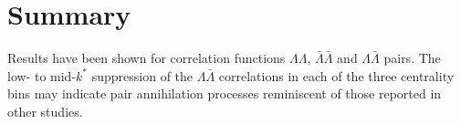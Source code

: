 \section{Summary}
Results have been shown for correlation functions $\Lambda\Lambda$, $\bar{\Lambda}\bar{\Lambda}$ and $\Lambda\bar{\Lambda}$ pairs.  The low- to mid-$k^*$ suppression of the $\Lambda\bar{\Lambda}$ correlations in each of the three centrality bins may indicate pair annihilation processes reminiscent of those reported in other studies.

